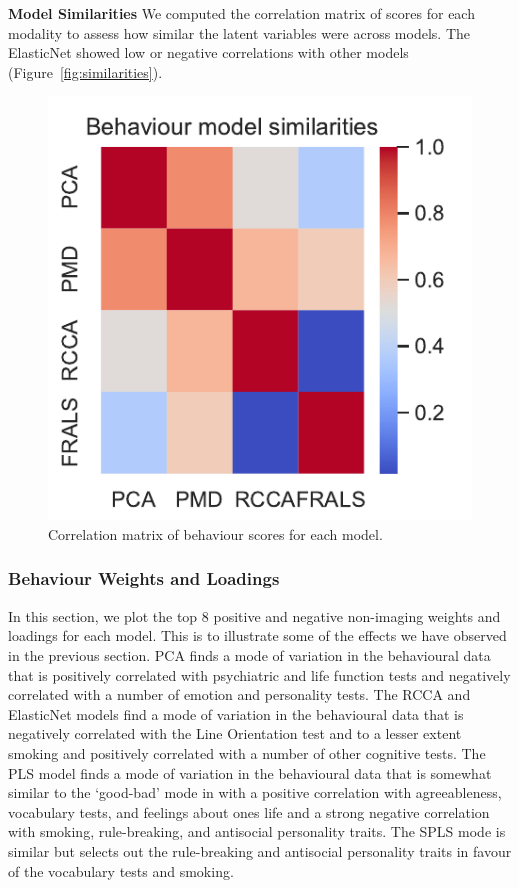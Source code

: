 \textbf{Model Similarities}
We computed the correlation matrix of scores for each modality to assess how similar the latent variables were across models.
The ElasticNet showed low or negative correlations with other models (Figure~\ref{fig:similarities}).

\begin{figure}
\centering
\includegraphics[width=0.49\linewidth]{figures/regularization/hcp/behaviour_model_similarities}
\caption{Correlation matrix of behaviour scores for each model.}
\label{fig:behavioursimilarities}
\end{figure}

\subsubsection{Behaviour Weights and Loadings}

In this section, we plot the top 8 positive and negative non-imaging weights and loadings for each model.
This is to illustrate some of the effects we have observed in the previous section.
PCA finds a mode of variation in the behavioural data that is positively correlated with psychiatric and life function tests and negatively correlated with a number of emotion and personality tests.
The RCCA and ElasticNet models find a mode of variation in the behavioural data that is negatively correlated with the Line Orientation test and to a lesser extent smoking and positively correlated with a number of other cognitive tests.
The PLS model finds a mode of variation in the behavioural data that is somewhat similar to the `good-bad' mode in \cite{smith2015positive} with a positive correlation with agreeableness, vocabulary tests, and feelings about ones life and a strong negative correlation with smoking, rule-breaking, and antisocial personality traits.
The SPLS mode is similar but selects out the rule-breaking and antisocial personality traits in favour of the vocabulary tests and smoking.

